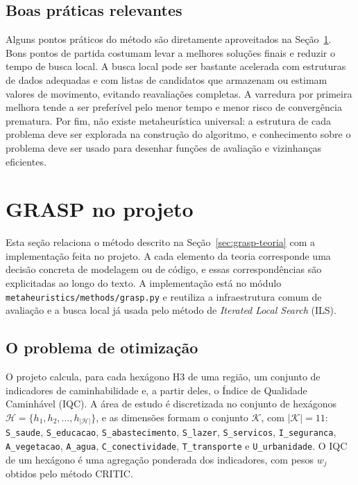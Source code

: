 \documentclass[11pt,a4paper]{article}
\newcommand{\code}[1]{\texttt{#1}}
\begin{document}
\subsection{Boas práticas relevantes}

Alguns pontos práticos do método são diretamente aproveitados na Seção~\ref{sec:grasp-projeto}. Bons pontos de partida costumam levar a melhores soluções finais e reduzir o tempo de busca local. A busca local pode ser bastante acelerada com estruturas de dados adequadas e com listas de candidatos que armazenam ou estimam valores de movimento, evitando reavaliações completas. A varredura por primeira melhora tende a ser preferível pelo menor tempo e menor risco de convergência prematura. Por fim, não existe metaheurística universal: a estrutura de cada problema deve ser explorada na construção do algoritmo, e conhecimento sobre o problema deve ser usado para desenhar funções de avaliação e vizinhanças eficientes.

\section{GRASP no projeto}
\label{sec:grasp-projeto}

Esta seção relaciona o método descrito na Seção~\ref{sec:grasp-teoria} com a implementação feita no projeto. A cada elemento da teoria corresponde uma decisão concreta de modelagem ou de código, e essas correspondências são explicitadas ao longo do texto. A implementação está no módulo \code{metaheuristics/methods/grasp.py} e reutiliza a infraestrutura comum de avaliação e a busca local já usada pelo método de \emph{Iterated Local Search} (ILS).

\subsection{O problema de otimização}

O projeto calcula, para cada hexágono H3 de uma região, um conjunto de indicadores de caminhabilidade e, a partir deles, o Índice de Qualidade Caminhável (IQC). A área de estudo é discretizada no conjunto de hexágonos $\mathcal{H} = \{h_1, h_2, \dots, h_{|\mathcal{H}|}\}$, e as dimensões formam o conjunto $\mathcal{K}$, com $|\mathcal{K}| = 11$: \code{S\_saude}, \code{S\_educacao}, \code{S\_abastecimento}, \code{S\_lazer}, \code{S\_servicos}, \code{I\_seguranca}, \code{A\_vegetacao}, \code{A\_agua}, \code{C\_conectividade}, \code{T\_transporte} e \code{U\_urbanidade}. O IQC de um hexágono é uma agregação ponderada dos indicadores, com pesos $w_j$ obtidos pelo método CRITIC.
\end{document}
